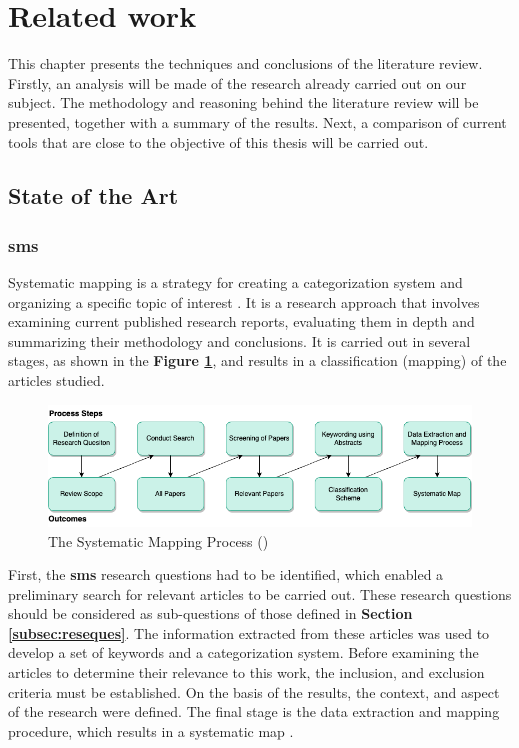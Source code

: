 \section{Related work\label{sec:relwork}}
This chapter presents the techniques and conclusions of the literature review. Firstly, an analysis will be made of the research already carried out on our subject. The methodology and reasoning behind the literature review will be presented, together with a summary of the results. Next, a comparison of current tools that are close to the objective of this thesis will be carried out.\\

    \subsection{State of the Art}
        \subsubsection{\acrfull{sms}}
        Systematic mapping is a strategy for creating a categorization system and organizing a specific topic of interest \cite{petersen2008systematic}. It is a research approach that involves examining current published research reports, evaluating them in depth and summarizing their methodology and conclusions. It is carried out in several stages, as shown in the \textbf{Figure \ref{fig:SysMapProcess}}, and results in a classification (mapping) of the articles studied.\\

        \begin{figure}[h]
            \centering
            \includegraphics[scale=0.6]{images/RelatedWork-SysMapProcess.drawio.png}
            \caption{\label{fig:SysMapProcess}  The Systematic Mapping Process (\cite{petersen2008systematic})}
        \end{figure}

        First, the \textbf{\acrshort{sms}} research questions had to be identified, which enabled a preliminary search for relevant articles to be carried out. These research questions should be considered as sub-questions of those defined in \textbf{Section \ref{subsec:reseques}}. The information extracted from these articles was used to develop a set of keywords and a categorization system. Before examining the articles to determine their relevance to this work, the inclusion, and exclusion criteria must be established. On the basis of the results, the context, and aspect of the research were defined. The final stage is the data extraction and mapping procedure, which results in a systematic map \cite{petersen2008systematic, petersen2015guidelines}.\\


